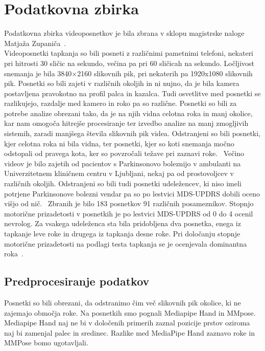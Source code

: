 \documentclass[a4paper,12pt]{article}  %
\begin{document}
\section{Podatkovna zbirka}

Podatkovna zbirka videoposnetkov je bila zbrana v sklopu magistrske naloge Matjaža Zupaniča~\cite{Zupanic}.\\

Videoposnetki tapkanja so bili posneti z različnimi pametnimi telefoni, nekateri pri hitrosti 30 sličic na 
sekundo, večina pa pri 60 sličicah na sekundo. Ločljivost snemanja je bila 3840$\times$2160 slikovnih pik, pri 
nekaterih pa 1920x1080 slikovnih pik. Posnetki so bili zajeti v različnih okoljih in ni nujno, da je bila 
kamera postavljena pravokotno na profil palca in kazalca. Tudi osvetlitve med posnetki se razlikujejo, razdalje 
med kamero in roko pa so različne. Posnetki so bili za potrebe analize obrezani tako, da je na njih vidna 
celotna roka in manj okolice, kar nam omogoča hitrejše procesiranje ter izvedbo analize na manj 
zmogljivih sistemih, zaradi manjšega števila slikovnih pik videa. Odstranjeni so bili posnetki, kjer 
celotna roka ni bila vidna, ter posnetki, kjer so koti snemanja močno odstopali od pravega kota, ker so 
povzročali težave pri zaznavi roke. \
Večino videov je bilo zajetih od pacientov s Parkinsonovo boleznijo v ambulanti na Univerzitetnem kliničnem 
centru v Ljubljani, nekaj pa od prostovoljcev v različnih okoljih. Odstranjeni so bili tudi posnetki udeležencev, ki niso imeli potrjene Parkinsonove bolezni
vendar pa so po lestvici MDS-UPDRS dobili oceno višjo od nič. \
Zbranih je bilo 183 posnetkov 91 različnih posameznikov. Stopnjo motorične prizadetosti v posnetkih je po 
lestvici MDS-UPDRS od 0 do 4 ocenil nevrolog. Za vsakega udeleženca sta bila pridobljena dva posnetka, enega 
iz tapkanje leve roke in drugega iz tapkanja desne roke. Pri določanju stopnje motorične prizadetosti na 
podlagi testa tapkanja se je ocenjevala dominantna roka~\cite{Zupanic}. 

\subsection{Predprocesiranje podatkov}

Posnetki so bili obrezani, da odstranimo čim več slikovnih pik okolice, ki ne zajemajo območja roke. Na posnetkih 
smo pognali Mediapipe Hand in MMpose. Mediapipe Hand naj ne bi v določenih primerih zaznal pozicije prstov 
oziroma naj bi zamenjal palec in sredinec. Razlike med MediaPipe Hand zaznavo roke in MMPose bomo ugotavljali. \\
\end{document}
